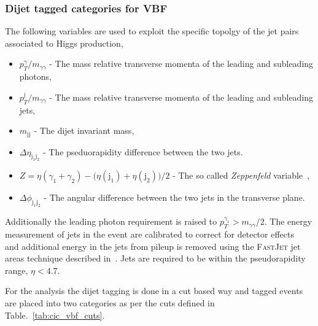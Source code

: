 \subsubsection{Dijet tagged categories for VBF}
\label{sec:vbf_tag}

The following variables are used to exploit the specific topolgy of the jet pairs associated to \VBF Higgs production,

\begin{itemize}
  \item $p_{T}^{\gamma}/m_{\gamma\gamma}$ - The mass relative transverse momenta of the leading and subleading photons,
  \item $p_{T}^{\mathrm{j}}/m_{\gamma\gamma}$ - The mass relative transverse momenta of the leading and subleading jets,
  \item $m_{\mathrm{jj}}$ - The dijet invariant mass,
  \item $\Delta\eta_{\mathrm{j}_{1}\mathrm{j}_{2}}$ - The pseduorapidity difference between the two jets.
  \item $Z = \eta(\gamma_{1}+\gamma_{2}) - \bigl(\eta(\mathrm{j}_{1})+\eta(\mathrm{j}_{2})\bigr)/2$ - The so called \emph{Zeppenfeld} variable~\cite{Zeppenfeld},
  \item $\Delta\phi_{\mathrm{j}_{1}\mathrm{j}_{2}}$ - The angular difference between the two jets in the transverse plane.
\end{itemize}

Additionally the leading photon \pT requirement is raised to $p_{T}^{\gamma_{1}}>m_{\gamma\gamma}/2$. The energy measurement of jets in the event are calibrated to correct for detector effects~\cite{jet_energy_corrections} and additional energy in the jets from pileup is removed using the \textsc{FastJet} jet areas technique described in~\cite{pu_jets1,pu_jets2,pu_jets3}. Jets are required to be within the pseudorapidity range, $\eta<4.7$.

For the \CiC analysis the dijet tagging is done in a cut based way and tagged events are placed into two categories as per the cuts defined in Table.~\ref{tab:cic_vbf_cuts}.

